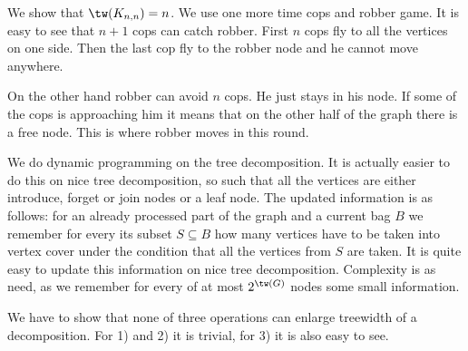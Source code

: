 {
We show that $\tw(K_{n,n}) = n$.
We use one more time cops and robber game. It is easy to see that $n+1$ cops can catch robber.
First $n$ cops fly to all the vertices on one side. Then the last cop fly to the robber node and he cannot move
anywhere.

On the other hand robber can avoid $n$ cops. He just stays in his node. If some of the cops is approaching him it means
that on the other half of the graph there is a free node. This is where robber moves in this round.
}




{
We do dynamic programming on the tree decomposition. It is actually easier to do this on nice tree
decomposition, so such that all the vertices are either introduce, forget or join nodes or a leaf node.
The updated information is as follows: for an already processed part of the graph and
a current bag $B$ we remember for every its subset $S \subseteq B$ how many vertices have to be
taken into vertex cover under the condition that all the vertices from $S$ are taken. It is quite easy
to update this information on nice tree decomposition. Complexity is as need, as we remember for every
of at most $2^{\tw(G)}$ nodes some small information.
}




{
We have to show that none of three operations can enlarge treewidth of a decomposition. For 1) and 2) it is trivial,
for 3) it is also easy to see.
}







{
}


